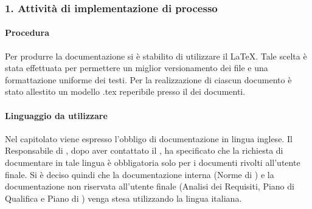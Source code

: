 \subsubsection{1. Attivit\`a di implementazione di processo}    %
  \paragraph*{Procedura}
  Per produrre la documentazione si è stabilito di utilizzare il  \LaTeX. Tale scelta è stata effettuata per permettere un miglior versionamento dei file e una formattazione uniforme dei testi.
  Per la realizzazione di ciascun documento \`e stato allestito un modello .tex reperibile presso il  dei documenti.

  \paragraph*{Linguaggio da utilizzare}
  Nel capitolato viene espresso l'obbligo di documentazione in lingua inglese. Il Responsabile di , dopo aver contattato il , ha specificato che la richiesta di documentare in tale lingua è obbligatoria solo per i documenti rivolti all'utente finale. Si è deciso quindi che la documentazione interna (Norme di ) e la documentazione non riservata all'utente finale (Analisi dei Requisiti, Piano di Qualifica e Piano di ) venga stesa utilizzando la lingua italiana.  
  





